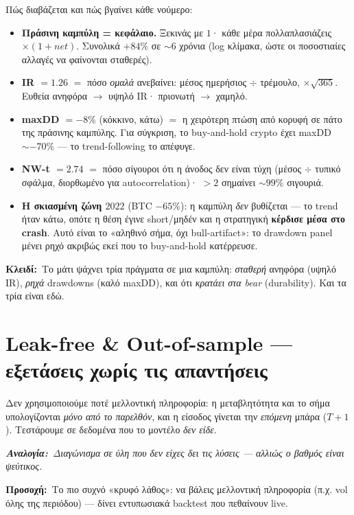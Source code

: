 \documentclass[11pt]{article}
\newcommand{\key}[1]{\par\medskip\noindent\colorbox{soft}{\parbox{\dimexpr\linewidth-2\fboxsep}{\textcolor{accent}{\textbf{Κλειδί:}}\ #1}}\par\medskip}
\newcommand{\analogy}[1]{\par\smallskip\noindent\textit{\textbf{Αναλογία:}\ #1}\par\smallskip}
\newcommand{\warnb}[1]{\par\medskip\noindent\colorbox{soft}{\parbox{\dimexpr\linewidth-2\fboxsep}{\textcolor{warn}{\textbf{Προσοχή:}}\ #1}}\par\medskip}
\begin{document}
Πώς διαβάζεται και πώς βγαίνει κάθε νούμερο:
\begin{itemize}[leftmargin=1.4em]
\item \textbf{Πράσινη καμπύλη = κεφάλαιο.} Ξεκινάς με $1$· κάθε μέρα πολλαπλασιάζεις $\times(1+net)$.
Συνολικά $+84\%$ σε $\sim 6$ χρόνια (log κλίμακα, ώστε οι ποσοστιαίες αλλαγές να φαίνονται σταθερές).
\item \textbf{IR $=1.26$} $=$ πόσο \emph{ομαλά} ανεβαίνει: μέσος ημερήσιος $\div$ τρέμουλο, $\times\sqrt{365}$.
Ευθεία ανηφόρα $\to$ υψηλό IR· πριονωτή $\to$ χαμηλό.
\item \textbf{maxDD $=-8\%$} (κόκκινο, κάτω) $=$ η χειρότερη πτώση από κορυφή σε πάτο της πράσινης
καμπύλης. Για σύγκριση, το buy-and-hold crypto έχει maxDD $\sim-70\%$ — το trend-following το απέφυγε.
\item \textbf{NW-t $=2.74$} $=$ πόσο σίγουροι ότι η άνοδος δεν είναι τύχη (μέσος $\div$ τυπικό σφάλμα,
διορθωμένο για autocorrelation)· $>2$ σημαίνει $\sim 99\%$ σιγουριά.
\item \textbf{Η σκιασμένη ζώνη $2022$} (BTC $-65\%$): η καμπύλη \emph{δεν} βυθίζεται — το trend ήταν κάτω,
οπότε η θέση έγινε short/μηδέν και η στρατηγική \textbf{κέρδισε μέσα στο crash}. Αυτό είναι το «αληθινό
σήμα, όχι bull-artifact»: το drawdown panel μένει ρηχό ακριβώς εκεί που το buy-and-hold κατέρρευσε.
\end{itemize}
\key{Το μάτι ψάχνει τρία πράγματα σε μια καμπύλη: \emph{σταθερή} ανηφόρα (υψηλό IR), \emph{ρηχά}
drawdowns (καλό maxDD), και ότι \emph{κρατάει στα bear} (durability). Και τα τρία είναι εδώ.}

\section{Leak-free \& Out-of-sample — εξετάσεις χωρίς τις απαντήσεις}
Δεν χρησιμοποιούμε ποτέ μελλοντική πληροφορία: η μεταβλητότητα και το σήμα υπολογίζονται \emph{μόνο
από το παρελθόν}, και η είσοδος γίνεται την \emph{επόμενη} μπάρα ($T{+}1$). Τεστάρουμε σε δεδομένα που
το μοντέλο \emph{δεν είδε}. \analogy{Διαγώνισμα σε ύλη που δεν είχες δει τις λύσεις — αλλιώς ο βαθμός
είναι ψεύτικος.}
\warnb{Το πιο συχνό «κρυφό λάθος»: να βάλεις μελλοντική πληροφορία (π.χ. vol όλης της περιόδου) — δίνει
εντυπωσιακά backtest που πεθαίνουν live.}
\end{document}
